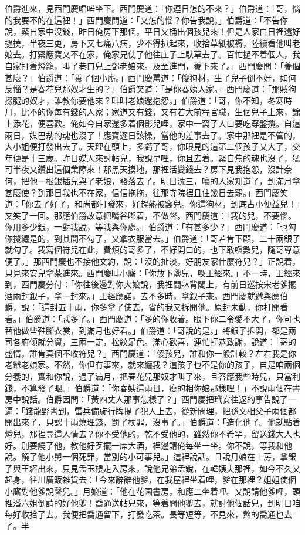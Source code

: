 伯爵進來，見西門慶唱喏坐下。西門慶道：「你連日怎的不來？」伯爵道：「哥，惱的我要不的在這裡！」西門慶問道：「又怎的惱？你告我說。」伯爵道：「不告你說，緊自家中沒錢，昨日俺房下那個，平日又桶出個孩兒來！但是人家白日裡還好撾撓，半夜三更，房下又七痛八病，少不得扒起來，收拾草紙被褥，陸續看他叫老娘去。打緊應寶又不在家，俺家兄使了他往庄子上馱草去了。百忙撾不着個人，我自家打着燈籠，叫了巷口兒上鄧老娘來。及至進門，養下來了。」西門慶問：「養個甚麼？」伯爵道：「養了個小廝。」西門慶罵道：「傻狗材，生了兒子倒不好，如何反惱？是春花兒那奴才生的？」伯爵笑道：「是你春姨人家。」西門慶道：「那賊狗掇腿的奴才，誰教你要他來？叫叫老娘還抱怨。」伯爵道：「哥，你不知，冬寒時月，比不的你每有錢的人家；家道又有錢，又有若大前程官職，生個兒子上來，錦上添花，便喜歡。俺如今自家還多着個影兒哩，家中一窩子人口要吃穿盤攪。自這兩日，媒巴劫的魂也沒了！應寶逐日該操，當他的差事去了。家中那裡是不管的，大小姐便打發出去了。天理在頭上，多虧了哥，你眼見的這第二個孩子又大了，交年便是十三歲。昨日媒人來討帖兒，我說早哩，你且去着。緊自焦的魂也沒了，猛可半夜又鑽出這個業障來！那黑天摸地，那裡活變錢去？房下見我抱怨，沒計奈何，把他一根銀插兒與了老娘，發落去了。明日洗三，嚷的人家知道了，到滿月拿甚麼使？到那日我也不在家，信信拖拖，往那寺院裡且住幾日去罷。」西門慶笑道：「你去了好了，和尚都打發來，好趕熱被窩兒。你這狗材，到底占小便益兒！」又笑了一回。那應伯爵故意把嘴谷嘟着，不做聲。西門慶道：「我的兒，不要惱。你用多少銀，一對我說，等我與你處。」伯爵道：「有甚多少？」西門慶道：「也勾你攪纏是的，到其間不勾了，又拿衣服當去。」伯爵道：「哥若肯下顧，二十兩銀子就勾了。我寫個符兒在此，費煩的哥多了，不好開口的，也下敢嗔數兒，隨哥尊意便了。」那西門慶也不接他文約，說：「沒的扯淡，好朋友家什麼符兒？」正說着，只見來安兒拿茶進來。西門慶叫小廝：「你放下盞兒，喚王經來。」不一時，王經來到，西門慶分付：「你往後邊對你大娘說，我裡間牀背閣上，有前日巡按宋老爹擺酒兩封銀子，拿一封來。」王經應諾，去不多時，拿銀子來。西門慶就遞與應伯爵，說：「這封五十兩，你多拿了使去，省的我又拆開他。原封未動，你打開看看。」伯爵道：「忒多了。」西門慶道：「多的你收着。眼下你二令愛不大了，你可也替他做些鞋腳衣裳，到滿月也好看。」伯爵道：「哥說的是。」將銀子拆開，都是兩司各府傾就分資，三兩一定，松紋足色。滿心歡喜，連忙打恭致謝，說道：「哥的盛情，誰肯真個不收符兒？」西門慶道：「傻孩兒，誰和你一般計較？左右我是你老爺老娘家。不然，你但有事來，就來纏我？這孩子也不是你的孩子，自是咱兩個分養的，實和你說，過了滿月，把春花兒那奴才叫了來，且答應我些時兒，只當利錢，不算發了眼。」伯爵道：「你春姨這兩日，瘦的相你娘那樣哩！」不說兩個在書房中說話。伯爵因問：「黃四丈人那事怎樣了？」西門慶把玳安往返的事告說了一遍：「錢龍野書到，雷兵備旋行牌提了犯人上去，從新問理，把孫文相父子兩個都開出來了，只認十兩燒理錢，罰了杖罪，沒事了。」伯爵道：「造化他了。他就點着燈兒，那裡尋這人情去？你不受他的，乾不受他的，雖然你不希罕，留送錢大人也好。別要饒了他，教他好歹擺一席大酒，裡邊請俺每坐一坐。你不說，等我和他說。饒了他小舅一個死罪，當別的小可事兒。」這裡說話。且說月娘在上房，拿銀子與王經出來，只見孟玉樓走入房來，說他兄弟孟銳，在韓姨夫那裡，如今不久又起身，往川廣販雜貨去：「今來辭辭他爹，在我屋裡坐着哩，爹在那裡？姐姐使個小廝對他爹說聲兒。」月娘道：「他在花園書房，和應二坐着哩。又說請他爹哩，頭裡潘六姐倒請的好他爹！喬通送帖兒來，等着問他爹去，就討他個話兒，到明日咱每好收拾了去。我便把喬通留下，打發吃茶。長等短等，不見來，熬的喬通也去了。半